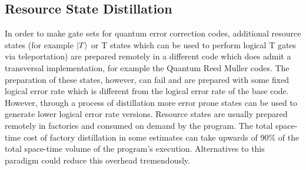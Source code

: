 \subsection{Resource State Distillation}
In order to make gate sets for quantum error correction codes, additional resource states (for example $\ket{T}$ or T states which can be used to perform logical T gates via teleportation) are prepared remotely in a different code which does admit a transversal implementation, for example the Quantum Reed Muller codes. The preparation of these states, however, can fail and are prepared with some fixed logical error rate which is different from the logical error rate of the base code. However, through a process of distillation more error prone states can be used to generate lower logical error rate versions. Resource states are usually prepared remotely in factories and consumed on demand by the program. The total space-time cost of factory distillation in some estimates can take upwards of 90\% of the total space-time volume of the program's execution. Alternatives to this paradigm could reduce this overhead tremendously.

